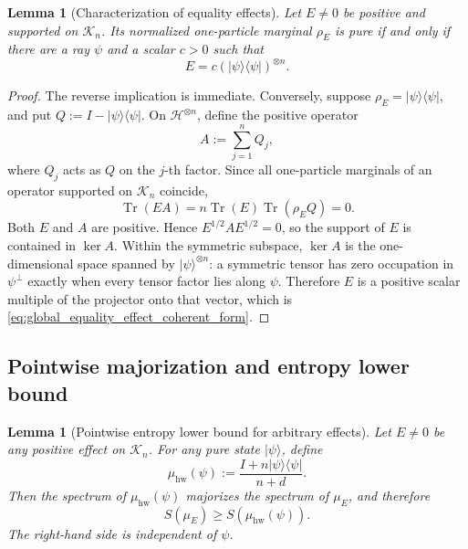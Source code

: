 \documentclass[journal]{IEEEtran}
\newtheorem{lemma}[theorem]{Lemma}
\newcommand{\ket}[1]{\lvert #1\rangle}
\newcommand{\bra}[1]{\langle #1\rvert}
\begin{document}
\begin{lemma}[Characterization of equality effects]
\label{lem:global_pure_marginal_coherent_effect}
Let \(E\ne0\) be positive and supported on \(\mathcal K_n\).  Its normalized
one-particle marginal \(\rho_E\) is pure if and only if there are a ray
\(\psi\) and a scalar \(c>0\) such that
\begin{equation}
    E=c(\ket\psi\bra\psi)^{\otimes n}.
    \label{eq:global_equality_effect_coherent_form}
\end{equation}
\end{lemma}
\begin{proof}
The reverse implication is immediate.  Conversely, suppose
\(\rho_E=\ket\psi\bra\psi\), and put
\(Q:=I-\ket\psi\bra\psi\).  On \(\mathcal H^{\otimes n}\), define the positive
operator
\[
    A:=\sum_{j=1}^n Q_j,
\]
where \(Q_j\) acts as \(Q\) on the \(j\)-th factor.  Since all one-particle
marginals of an operator supported on \(\mathcal K_n\) coincide,
\[
    \operatorname{Tr}(EA)
    =n\operatorname{Tr}(E)\operatorname{Tr}(\rho_E Q)=0.
\]
Both \(E\) and \(A\) are positive.  Hence
\(E^{1/2}AE^{1/2}=0\), so the support of \(E\) is contained in
\(\ker A\).  Within the symmetric subspace, \(\ker A\) is the one-dimensional
space spanned by \(\ket\psi^{\otimes n}\): a symmetric tensor has zero
occupation in \(\psi^\perp\) exactly when every tensor factor lies along
\(\psi\).  Therefore \(E\) is a positive scalar multiple of the projector onto
that vector, which is \eqref{eq:global_equality_effect_coherent_form}.
\end{proof}

\subsection{Pointwise majorization and entropy lower bound}
\label{subsec:global_pointwise_majorization}

\begin{lemma}[Pointwise entropy lower bound for arbitrary effects]
\label{lem:global_pointwise_entropy_lower_bound}
Let \(E\ne0\) be any positive effect on \(\mathcal K_n\).  For any pure state
\(\ket\psi\), define
\begin{equation}
    \mu_{\mathrm{hw}}(\psi)
    :=
    \frac{I+n\ket\psi\bra\psi}{n+d}.
    \label{eq:global_highest_weight_posterior_reference}
\end{equation}
Then the spectrum of \(\mu_{\mathrm{hw}}(\psi)\) majorizes the spectrum of
\(\mu_E\), and therefore
\begin{equation}
    S(\mu_E)
    \ge
    S\!\left(\mu_{\mathrm{hw}}(\psi)\right).
    \label{eq:global_pointwise_entropy_bound}
\end{equation}
The right-hand side is independent of \(\psi\).
\end{lemma}
\end{document}
